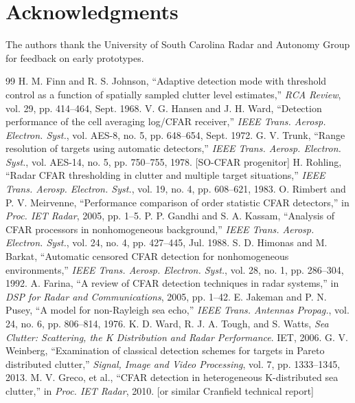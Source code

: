 \documentclass[10pt,letterpaper]{article}
\begin{document}
\section*{Acknowledgments}
The authors thank the University of South Carolina Radar and Autonomy Group for feedback on early prototypes.

\begin{thebibliography}{99}
 H. M. Finn and R. S. Johnson, ``Adaptive detection mode with threshold control as a function of spatially sampled clutter level estimates,'' \emph{RCA Review}, vol. 29, pp. 414--464, Sept. 1968.
 V. G. Hansen and J. H. Ward, ``Detection performance of the cell averaging log/CFAR receiver,'' \emph{IEEE Trans. Aerosp. Electron. Syst.}, vol. AES-8, no. 5, pp. 648--654, Sept. 1972.
 G. V. Trunk, ``Range resolution of targets using automatic detectors,'' \emph{IEEE Trans. Aerosp. Electron. Syst.}, vol. AES-14, no. 5, pp. 750--755, 1978. [SO-CFAR progenitor]
 H. Rohling, ``Radar CFAR thresholding in clutter and multiple target situations,'' \emph{IEEE Trans. Aerosp. Electron. Syst.}, vol. 19, no. 4, pp. 608--621, 1983.
 O. Rimbert and P. V. Meirvenne, ``Performance comparison of order statistic CFAR detectors,'' in \emph{Proc. IET Radar}, 2005, pp. 1--5.
 P. P. Gandhi and S. A. Kassam, ``Analysis of CFAR processors in nonhomogeneous background,'' \emph{IEEE Trans. Aerosp. Electron. Syst.}, vol. 24, no. 4, pp. 427--445, Jul. 1988.
 S. D. Himonas and M. Barkat, ``Automatic censored CFAR detection for nonhomogeneous environments,'' \emph{IEEE Trans. Aerosp. Electron. Syst.}, vol. 28, no. 1, pp. 286--304, 1992.
 A. Farina, ``A review of CFAR detection techniques in radar systems,'' in \emph{DSP for Radar and Communications}, 2005, pp. 1--42.
 E. Jakeman and P. N. Pusey, ``A model for non-Rayleigh sea echo,'' \emph{IEEE Trans. Antennas Propag.}, vol. 24, no. 6, pp. 806--814, 1976.
 K. D. Ward, R. J. A. Tough, and S. Watts, \emph{Sea Clutter: Scattering, the K Distribution and Radar Performance}. IET, 2006.
 G. V. Weinberg, ``Examination of classical detection schemes for targets in Pareto distributed clutter,'' \emph{Signal, Image and Video Processing}, vol. 7, pp. 1333--1345, 2013.
 M. V. Greco, et al., ``CFAR detection in heterogeneous K-distributed sea clutter,'' in \emph{Proc. IET Radar}, 2010. [or similar Cranfield technical report]

\end{thebibliography}
\end{document}
